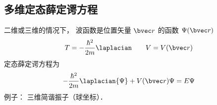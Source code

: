 
\subsection{多维定态薛定谔方程}
二维或三维的情况下， 波函数是位置矢量 $\bvec r$ 的函数 $\Psi(\bvec r)$
\begin{equation}
T = -\frac{\hbar^2}{2m} \laplacian \qquad V = V(\bvec r)
\end{equation}
定态薛定谔方程为
\begin{equation}\label{TISEn_eq4}
-\frac{\hbar^2}{2m} \laplacian {\Psi} + V(\bvec r)\Psi = E \Psi
\end{equation}
例子： 三维简谐振子（球坐标）．
